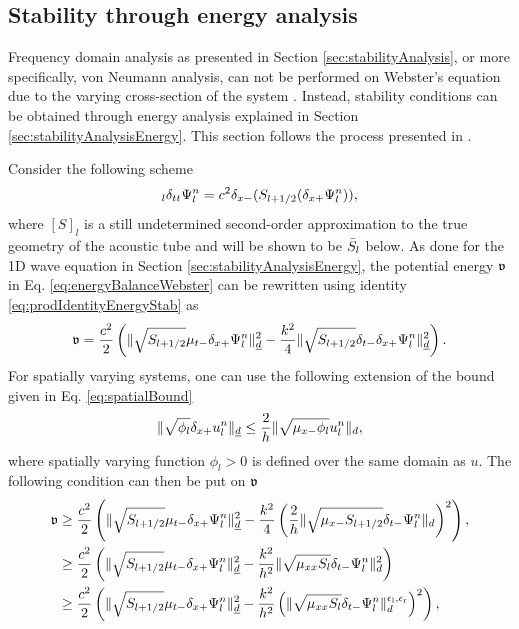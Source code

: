 {\subsection{Stability through energy analysis}\label{sec:stabilityEnergyWebster}
Frequency domain analysis as presented in Section \ref{sec:stabilityAnalysis}, or more specifically, von Neumann analysis, can not be performed on Webster's equation due to the varying cross-section of the system \cite{theBible}. Instead, stability conditions can be obtained through energy analysis explained in Section \ref{sec:stabilityAnalysisEnergy}. This section follows the process presented in \cite[Sec. 9.1.5, pp. 255--256]{theBible}.

Consider the following scheme
\begin{equation}
    [S]_l \delta_{tt}\Psi^n_l = c^2\dxm(\Sp(\delta_{x+}\Psiln)),
\end{equation}
where $[S]_l$ is a still undetermined second-order approximation to the true geometry of the acoustic tube and will be shown to be $\bar{S}_l$ below. As done for the 1D wave equation in Section \ref{sec:stabilityAnalysisEnergy}, the potential energy $\mathfrak{v}$ in Eq. \eqref{eq:energyBalanceWebster} can be rewritten using identity \eqref{eq:prodIdentityEnergyStab} as
\begin{equation*}
    \mathfrak{v} = \frac{c^2}{2}\left(\lVert\sqrt{S_{l+1/2}}\mu_{t-}\delta_{x+}\Psi_l^n\rVert_{\underline{d}}^2-\frac{k^2}{4}\lVert\sqrt{S_{l+1/2}}\delta_{t-}\delta_{x+} \Psi_l^n\rVert_{\underline{d}}^2\right).
\end{equation*}
For spatially varying systems, one can use the following extension of the bound given in Eq. \eqref{eq:spatialBound} \cite{theBible}
\begin{equation}\label{eq:spatialBoundWebster}
    \lVert \sqrt{\phi_l}\delta_{x+} u_l^n \rVert_{\underline{d}} \leq\frac{2}{h}\lVert \sqrt{\mu_{x-}\phi_l} u_l^n \rVert_d,
\end{equation}
where spatially varying function $\phi_l > 0$ is defined over the same domain as $u$. The following condition can then be put on $\mathfrak{v}$
\begin{align*}
    \v &\geq \frac{c^2}{2}\left(\lVert\sqrt{S_{l+1/2}}\mtm\dxp\Psiln\rVert_{\underline{d}}^2 - \frac{k^2}{4}\left(\frac{2}{h}\lVert\sqrt{\mxm \Sp}\dtm\Psiln\rVert_{d}\right)^2\right),\\
    &\geq \frac{c^2}{2}\left(\lVert\sqrt{S_{l+1/2}}\mtm\dxp\Psiln\rVert_{\underline{d}}^2 - \frac{k^2}{h^2}\lVert\sqrt{\mxx S_l}\dtm\Psiln\rVert_{d}^2\right)\\
    & \geq \frac{c^2}{2}\left(\lVert\sqrt{S_{l+1/2}}\mtm\dxp\Psiln\rVert_{\underline{d}}^2 - \frac{k^2}{h^2}\left(\lVert\sqrt{\mxx S_l}\dtm\Psiln\rVert_{d}^{\el,\er}\right)^2\right),

\end{align*}}
